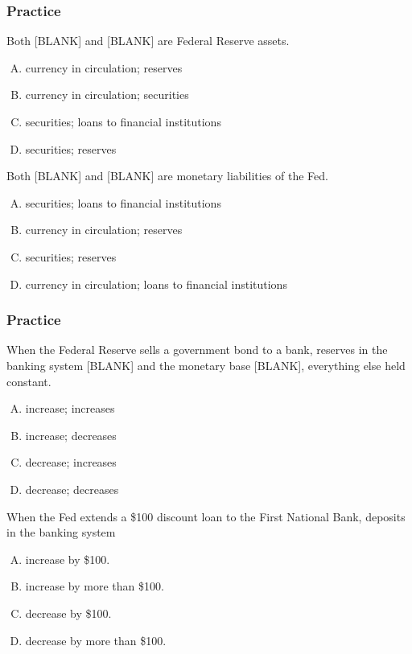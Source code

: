 \documentclass{beamer}
\begin{document}
\begin{practiceframe}
\frametitle{Practice}

Both [BLANK] and [BLANK] are Federal Reserve assets.
\begin{enumerate}[A. ]
    \item currency in circulation; reserves
    \item currency in circulation; securities
    \item securities; loans to financial institutions
    \item securities; reserves
\end{enumerate}

Both [BLANK] and [BLANK] are monetary liabilities of the Fed.
\begin{enumerate}[A. ]
    \item securities; loans to financial institutions
    \item currency in circulation; reserves
    \item securities; reserves
    \item currency in circulation; loans to financial institutions
\end{enumerate}

\end{practiceframe}

\begin{practiceframe}
\frametitle{Practice}

    When the Federal Reserve sells a government bond to a bank, reserves in the banking system [BLANK] and the monetary base [BLANK], everything else held constant.
    \begin{enumerate}[A. ]
        \item increase; increases
        \item increase; decreases
        \item decrease; increases
        \item decrease; decreases
    \end{enumerate}
    
    When the Fed extends a \$100 discount loan to the First National Bank, deposits in the banking system
    \begin{enumerate}[A. ]
        \item increase by \$100.
        \item increase by more than \$100.
        \item decrease by \$100.
        \item decrease by more than \$100.
    \end{enumerate}

\end{practiceframe}
\end{document}
